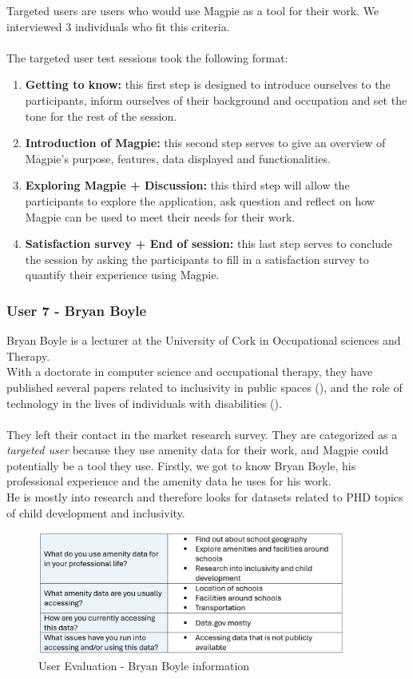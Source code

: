 Targeted users are users who would use Magpie as a tool for their work. We interviewed 3 individuals who fit this criteria.\\ \\
The targeted user test sessions took the following format:
\begin{enumerate}
    \item \textbf{Getting to know:} this first step is designed to introduce ourselves to the participants, inform ourselves of their background and occupation and set the tone for the rest of the session.
    \item \textbf{Introduction of Magpie:} this second step serves to give an overview of Magpie's purpose, features, data displayed and functionalities.
    \item \textbf{Exploring Magpie + Discussion:} this third step will allow the participants to explore the application, ask question and reflect on how Magpie can be used to meet their needs for their work.
    \item \textbf{Satisfaction survey + End of session:} this last step serves to conclude the session by asking the participants to fill in a satisfaction survey to quantify their experience using Magpie.
\end{enumerate}

\subsubsection{User 7 - Bryan Boyle}
Bryan Boyle is a lecturer at the University of Cork in Occupational sciences and Therapy.\\ With a doctorate in computer science and occupational therapy, they have published several papers related to inclusivity in public spaces (\cite{bryanboyleplaygroundinclusion2023}), and the role of technology in the lives of individuals with disabilities (\cite{bryanboylechildrenautism2022}).\\ \\
They left their contact in the market research survey. They are categorized as a \emph{targeted user} because they use amenity data for their work, and Magpie could potentially be a tool they use.
\noindent Firstly, we got to know Bryan Boyle, his professional experience and the amenity data he uses for his work.\\
He is mostly into research and therefore looks for datasets related to PHD topics of child development and inclusivity.
\begin{figure}[h!]
    \centering
    \includegraphics[width=0.9\textwidth]{images/bryan-amenity-info.png}
    \caption{User Evaluation - Bryan Boyle information}
\end{figure}\\

